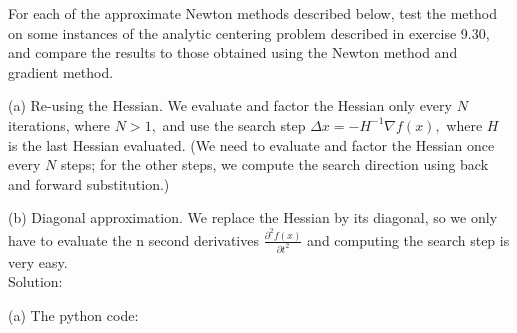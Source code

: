 \documentclass{article}
\begin{document}
For each of the approximate Newton methods described below, test the method on some
instances of the analytic centering problem described in exercise 9.30, and compare the
results to those obtained using the Newton method and gradient method.

(a) Re-using the Hessian. We evaluate and factor the Hessian only every $N$ iterations,
where $N > 1,$ and use the search step 
$\Delta x = - H^{-1} \nabla f(x),$ where $H$ is the last Hessian evaluated. (We need to evaluate and factor the Hessian once every $N$ steps; for the
other steps, we compute the search direction using back and forward substitution.)

(b) Diagonal approximation. We replace the Hessian by its diagonal, so we only have
to evaluate the n second derivatives 
$\frac{\partial^2 f(x)}{\partial t^2}$ and computing the search step is very easy.\\

Solution:

(a) The python code:
\end{document}
